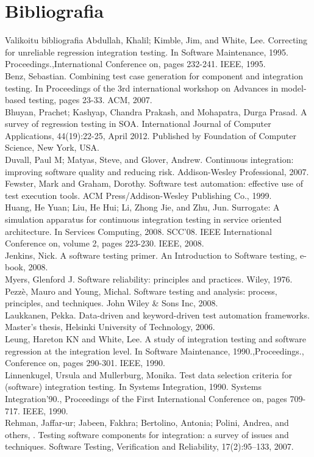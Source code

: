 \documentclass{beamer}
\begin{document}
\section{Bibliografia}
\begin{frame}[allowframebreaks]{Valikoitu bibliografia} 
\tiny
Abdullah, Khalil; Kimble, Jim, and White, Lee. Correcting for unreliable regression integration testing. In Software Maintenance, 1995. Proceedings.,International Conference on, pages 232-241. IEEE, 1995.
\\[0.1in]
Benz, Sebastian. Combining test case generation for component and integration testing. In Proceedings of the 3rd international workshop on Advances in model-based testing, pages 23-33. ACM, 2007.
\\[0.1in]
Bhuyan, Prachet; Kashyap, Chandra Prakash, and Mohapatra, Durga Prasad. A survey of regression testing in SOA. International Journal of Computer Applications, 44(19):22-25, April 2012. Published by Foundation of Computer Science, New York, USA.
\\[0.1in]
Duvall, Paul M; Matyas, Steve, and Glover, Andrew. Continuous integration:
improving software quality and reducing risk. Addison-Wesley Professional,
2007.
\\[0.1in]
Fewster, Mark and Graham, Dorothy. Software test automation: effective use of
test execution tools. ACM Press/Addison-Wesley Publishing Co., 1999.
\\[0.1in]
Huang, He Yuan; Liu, He Hui; Li, Zhong Jie, and Zhu, Jun. Surrogate: A simulation apparatus for continuous integration testing in service oriented architecture. In Services Computing, 2008. SCC'08. IEEE International Conference on, volume 2, pages 223-230. IEEE, 2008.
\\[0.1in]
Jenkins, Nick. A software testing primer. An Introduction to Software testing, e-book, 2008.
\\[0.1in]
Myers, Glenford J. Software reliability: principles and practices. Wiley, 1976.
Pezzè, Mauro and Young, Michal. Software testing and analysis: process, principles, and techniques. John Wiley & Sons Inc, 2008.
\\[0.1in]
Laukkanen, Pekka. Data-driven and keyword-driven test automation frameworks. Master’s thesis, Helsinki University of Technology, 2006.
\\[0.1in]
Leung, Hareton KN and White, Lee. A study of integration testing and software regression at the integration level. In Software Maintenance, 1990.,Proceedings., Conference on, pages 290-301. IEEE, 1990.
\\[0.1in]
Linnenkugel, Ursula and Mullerburg, Monika. Test data selection criteria for (software) integration testing. In Systems Integration, 1990. Systems Integration'90., Proceedings of the First International Conference on, pages 709-717. IEEE, 1990.
\\[0.1in]
Rehman, Jaffar-ur; Jabeen, Fakhra; Bertolino, Antonia; Polini, Andrea, and others, . Testing software components for integration: a survey of issues and techniques. Software Testing, Veriﬁcation and Reliability, 17(2):95–133,
2007.
% 

\end{frame} 
\end{document}
